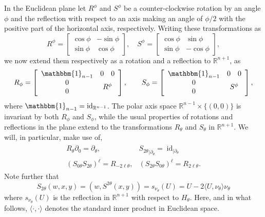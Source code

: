 \documentclass[11pt,a4paper,times]{amsart}
\theoremstyle{plain}
\theoremstyle{definition}
\numberwithin{equation}{section}
\DeclareMathOperator\id{id}
\newcommand{\R}{\mathbb{R}}
\newcommand{\txtg}{\textcolor{green}}
\begin{document}
In the Euclidean plane let $R^{\phi}$ and $S^{\phi}$ be a counter-clockwise rotation by an angle $\phi$ and the reflection with respect to an axis
making an angle of $\phi/2$ with the positive part of the horizontal axis, respectively. Writing these transformations as
\[
R^{\phi}=\left[\begin{array}{cc}
\cos \phi &-\sin \phi\\ \sin\phi&\cos\phi\end{array}\right], \quad  S^{\phi}=\left[
\begin{array}{cc}\cos \phi &\sin \phi\\ \sin\phi&-\cos\phi\end{array}\right],
\]
we now extend them respectively as a rotation and a reflection to $\R^{n+1}$, as
\begin{equation}\label{RSphi}
R_{\phi}=\left[\begin{array}{cc}
\mathbbm{1}_{n-1}&0\quad 0\\ 
\begin{array}{c} 0\\0\end{array}& R^{\phi}\end{array}\right], \quad\quad
S_{\phi}=\left[\begin{array}{cc}
\mathbbm{1}_{n-1}&0\quad 0\\ 
\begin{array}{c} 0\\0\end{array}& S^{\phi}\end{array}\right],
\end{equation}
where $\mathbbm{1}_{n-1}=\id_{\R^{n-1}}$. The polar axis space $\R^{n-1}\times\{(0,0)\}$ is invariant by both $R_{\phi}$ and $S_{\phi}$,
while the usual properties of rotations and reflections in the plane extend to the transformations $R_{\theta}$ and
$S_{\theta}$ in $\R^{n+1}$. We will, in particular, make use of, %
\begin{gather}\label{ALI2}
\begin{array}{ll}
R_{\theta}\partial_0=\partial_{\theta}, &{S_{2\theta}}_{| \partial_{\theta}}=\id_{|\partial_{\theta}}\\
(S_{0\theta}S_{2\theta})^{\ell}=R_{-2\ell\theta},
&(S_{2\theta}S_{0\theta})^{\ell}=R_{2\ell\theta}.
\end{array}
\end{gather}
Note further that
\begin{equation}\label{R2redution}
S_{2\theta}(w,x,y)= (w, S^{2\theta}(x,y))= s_{\nu_{\theta}}(U)=U-2\langle U,\nu_{\theta}\rangle \nu_{\theta}
\end{equation}
where  $s_{\nu_{\theta}}(U)$
is the reflection  in $\R^{n+1}$ with respect to  $H_{\theta}$. Here, and in what follows, $\langle \cdot,\cdot \rangle$ denotes
the standard inner product in Euclidean space.
\end{document}
